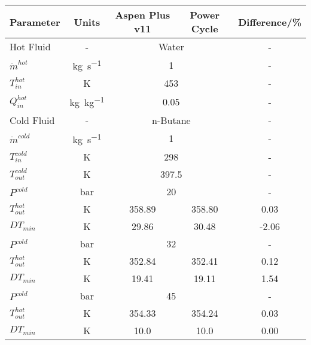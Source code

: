 \begin{tabular}{|p{2.5cm} c c c c|}
    \hline
    \rowcolor{bluepoli!40} %
    \textbf{Parameter} & \textbf{Units} & \textbf{Aspen Plus v11} & \textbf{Power Cycle} & \textbf{Difference/\unit{\percent}} \T\B \\
    \hline \hline
    Hot Fluid & - & \multicolumn{2}{c}{Water} & - \T\B\\
    \(\Dot{m}^{hot}\) & \unit{\kg\per\s} & \multicolumn{2}{c}{\num{1}} & - \T\B\\
    \(T_{in}^{hot}\) & \unit{\K} & \multicolumn{2}{c}{\num{453}} & - \T\B\\
    \(Q_{in}^{hot}\) & \unit{\kg\per\kg} & \multicolumn{2}{c}{\num{0.05}} & - \T\B\\
    \hline
    Cold Fluid & - & \multicolumn{2}{c}{n-Butane} & - \T\B\\
    \(\Dot{m}^{cold}\) & \unit{\kg\per\s} & \multicolumn{2}{c}{\num{1}} & - \T\B\\
    \(T_{in}^{cold}\) & \unit{\K} & \multicolumn{2}{c}{\num{298}} & - \T\B\\
    \(T_{out}^{cold}\) & \unit{\K} & \multicolumn{2}{c}{\num{397.5}} & - \T\B\\
    \hline\hline
    \(P^{cold}\) & \unit{\bar} & \multicolumn{2}{c}{\num{20}} & - \T\B\\
    \hline
    \(T_{out}^{hot}\) & \unit{\K} & 358.89 & 358.80 & 0.03 \T\B\\
    \(DT_{min}\) & \unit{\K} & 29.86 & 30.48 & -2.06 \T\B\\
    \hline \hline
    \(P^{cold}\) & \unit{\bar} & \multicolumn{2}{c}{\num{32}} & - \T\B\\
    \hline
    \(T_{out}^{hot}\) & \unit{\K} & 352.84 & 352.41 & 0.12 \T\B\\
    \(DT_{min}\) & \unit{\K} & 19.41 & 19.11 & 1.54 \T\B\\
    \hline \hline
    \(P^{cold}\) & \unit{\bar} & \multicolumn{2}{c}{\num{45}} & - \T\B\\
    \hline
    \(T_{out}^{hot}\) & \unit{\K} & 354.33 & 354.24 & 0.03 \T\B\\
    \(DT_{min}\) & \unit{\K} & 10.0 & 10.0 & 0.00 \T\B\\
    \hline
\end{tabular}